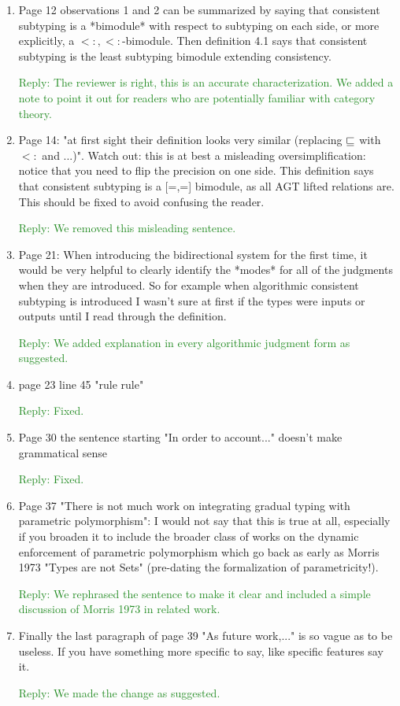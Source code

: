 \documentclass[dvipsnames]{article}
\newcommand\reply[1]{\textcolor{ForestGreen}{Reply: #1}}
\begin{document}
\begin{enumerate}
\item Page 12 observations 1 and 2 can be summarized by saying that
  consistent subtyping is a *bimodule* with respect to subtyping on
  each side, or more explicitly, a $<:,<:$-bimodule. Then definition
  4.1 says that consistent subtyping is the least subtyping bimodule
  extending consistency.

  \reply{The reviewer is right, this is an accurate characterization. We added a
    note to point it out for readers who are potentially familiar with category
    theory.}

\item Page 14: "at first sight their definition looks very similar (replacing
  $\sqsubseteq$ with $<:$ and ...)". Watch out: this is at best a misleading
  oversimplification: notice that you need to flip the precision on one side.
  This definition says that consistent subtyping is a [=,=] bimodule, as all AGT
  lifted relations are. This should be fixed to avoid confusing the reader.

  \reply{We removed this misleading sentence.}

\item Page 21: When introducing the bidirectional system for the first time, it
  would be very helpful to clearly identify the *modes* for all of the judgments
  when they are introduced. So for example when algorithmic consistent subtyping
  is introduced I wasn't sure at first if the types were inputs or outputs until
  I read through the definition.

  \reply{We added explanation in every algorithmic judgment form as suggested.}

\item page 23 line 45 "rule rule"

  \reply{Fixed.}

\item Page 30 the sentence starting "In order to account..." doesn't make
  grammatical sense

  \reply{Fixed.}

\item Page 37 "There is not much work on integrating gradual typing with
  parametric polymorphism": I would not say that this is true at all, especially
  if you broaden it to include the broader class of works on the dynamic
  enforcement of parametric polymorphism which go back as early as Morris 1973
  "Types are not Sets" (pre-dating the formalization of parametricity!).

  \reply{We rephrased the sentence to make it clear and included a simple
    discussion of Morris 1973 in related work.}

\item Finally the last paragraph of page 39 "As future work,..." is so vague as
  to be useless. If you have something more specific to say, like specific
  features say it.

  \reply{We made the change as suggested.}
\end{enumerate}
\end{document}
